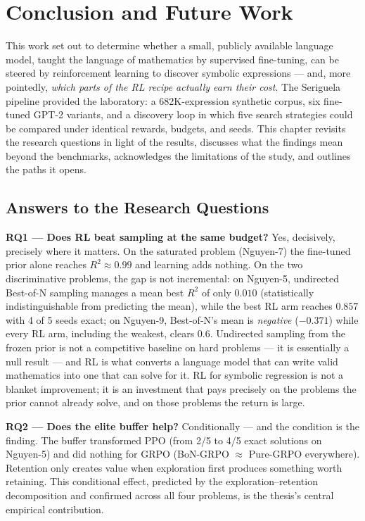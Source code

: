 \chapter{Conclusion and Future Work}
\label{ch:conclusion}

This work set out to determine whether a small, publicly available language model, taught the language of mathematics by supervised fine-tuning, can be steered by reinforcement learning to discover symbolic expressions --- and, more pointedly, \emph{which parts of the RL recipe actually earn their cost}. The Seriguela pipeline provided the laboratory: a 682K-expression synthetic corpus, six fine-tuned GPT-2 variants, and a discovery loop in which five search strategies could be compared under identical rewards, budgets, and seeds. This chapter revisits the research questions in light of the results, discusses what the findings mean beyond the benchmarks, acknowledges the limitations of the study, and outlines the paths it opens.

\section{Answers to the Research Questions}

\textbf{RQ1 --- Does RL beat sampling at the same budget?} Yes, decisively, precisely where it matters. On the saturated problem (Nguyen-7) the fine-tuned prior alone reaches $R^2 \approx 0.99$ and learning adds nothing. On the two discriminative problems, the gap is not incremental: on Nguyen-5, undirected Best-of-N sampling manages a mean best $R^2$ of only $0.010$ (statistically indistinguishable from predicting the mean), while the best RL arm reaches $0.857$ with 4 of 5 seeds exact; on Nguyen-9, Best-of-N's mean is \emph{negative} ($-0.371$) while every RL arm, including the weakest, clears $0.6$. Undirected sampling from the frozen prior is not a competitive baseline on hard problems --- it is essentially a null result --- and RL is what converts a language model that can write valid mathematics into one that can solve for it. RL for symbolic regression is not a blanket improvement; it is an investment that pays precisely on the problems the prior cannot already solve, and on those problems the return is large.

\textbf{RQ2 --- Does the elite buffer help?} Conditionally --- and the condition is the finding. The buffer transformed PPO (from 2/5 to 4/5 exact solutions on Nguyen-5) and did nothing for GRPO (BoN-GRPO $\approx$ Pure-GRPO everywhere). Retention only creates value when exploration first produces something worth retaining. This conditional effect, predicted by the exploration--retention decomposition and confirmed across all four problems, is the thesis's central empirical contribution.

